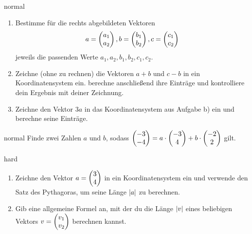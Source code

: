 \documentclass[]{uebungsblatt}
\begin{document}
    \begin{exercise}{normal}
        \begin{enumerate}
            \item Bestimme für die rechts abgebildeten Vektoren 
            \[a=\begin{pmatrix} a_1\\ a_2 \end{pmatrix}, b=\begin{pmatrix} b_1\\ b_2 \end{pmatrix}, 
            c=\begin{pmatrix} c_1\\ c_2 \end{pmatrix}\] 
            jeweils die passenden Werte
            $a_1,a_2,b_1,b_2,c_1,c_2$.
            \item Zeichne (ohne zu rechnen) die Vektoren $a+b$ und $c-b$ in ein Koordinatensystem ein. berechne
            anschließend ihre Einträge und kontrolliere dein Ergebnis mit deiner Zeichnung.
            \item Zeichne den Vektor $3a$ in das Koordinatensystem aus Aufgabe b) ein und berechne seine Einträge.
        \end{enumerate}
    \end{exercise}

    \begin{exercise}{normal}
        Finde zwei Zahlen $a$ und $b$, sodass $\begin{pmatrix} -3\\ -4 \end{pmatrix}=a\cdot\begin{pmatrix} -3\\ 4 \end{pmatrix}+b\cdot\begin{pmatrix} -2\\ 2 \end{pmatrix}$ gilt.
    \end{exercise}

    \begin{exercise}{hard}
        \begin{enumerate}
            \item Zeichne den Vektor $a=\begin{pmatrix} 3\\ 4 \end{pmatrix}$ in ein Koordinatensystem ein und verwende den Satz des Pythagoras, 
            um seine Länge $\lvert a\rvert$ zu berechnen.
            \item Gib eine allgemeine Formel an, mit der du die Länge $\lvert v\rvert$ eines beliebigen Vektors 
            $v=\begin{pmatrix} v_1\\ v_2 \end{pmatrix}$ berechnen kannst.
        \end{enumerate}
    \end{exercise}
\end{document}
